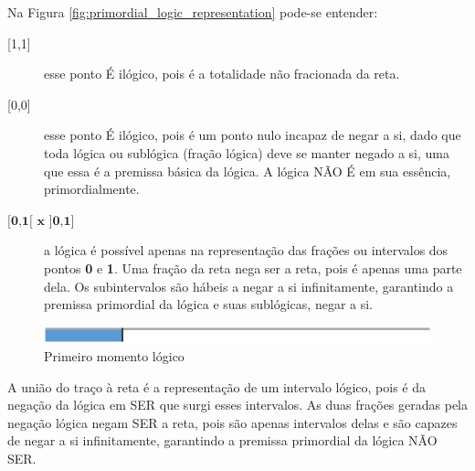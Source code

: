 \bigbreak
Na Figura \ref{fig:primordial_logic_representation} pode-se entender:
\begin{description}
   \item[{[1,1]}] esse ponto É ilógico, pois é a totalidade não fracionada da reta.
   \item[{[0,0]}] esse ponto É ilógico, pois é um ponto nulo incapaz de negar a si, dado que toda lógica ou sublógica (fração lógica) deve se manter negado a si, uma que essa é a premissa básica da lógica. A lógica NÃO É em sua essência, primordialmente.
   \item[$\textbf{{[0,1[ x ]0,1]}}$]a lógica é possível apenas na representação das frações ou intervalos dos pontos \textbf{0} e \textbf{1}. Uma fração da reta nega ser a reta, pois é apenas uma parte dela. Os subintervalos são hábeis a negar a si infinitamente, garantindo a premissa primordial da lógica e suas sublógicas, negar a si. 
\end{description}

\bigbreak
\begin{figure}[hbtp]
\caption{Primeiro momento lógico}
\label{fig:first_logical_moment}
\centering
\includegraphics[scale=1]{sections/images/first_logical_moment.jpg}
\end{figure}

A união do traço à reta é a representação de um intervalo lógico, pois é da negação da lógica em SER que surgi esses intervalos. As duas frações geradas pela negação lógica negam SER a reta, pois são apenas intervalos delas e são capazes de negar a si infinitamente, garantindo a premissa primordial da lógica NÃO SER. 





